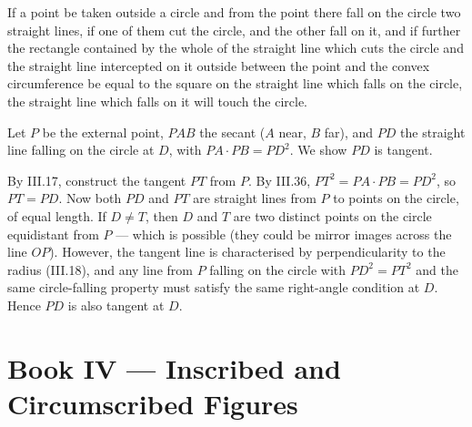 \documentclass{rrxiv}
\begin{document}
\begin{claim}
\label{prop:III.37}
If a point be taken outside a circle and from the point there fall
on the circle two straight lines, if one of them cut the circle, and
the other fall on it, and if further the rectangle contained by the
whole of the straight line which cuts the circle and the straight
line intercepted on it outside between the point and the convex
circumference be equal to the square on the straight line which
falls on the circle, the straight line which falls on it will touch
the circle.
\end{claim}
\begin{evidence}
\label{ev:III.37}
Let $P$ be the external point, $PAB$ the secant ($A$ near, $B$
far), and $PD$ the straight line falling on the circle at $D$,
with $PA \cdot PB = PD^2$.  We show $PD$ is tangent.

By III.17, construct the tangent $PT$ from $P$.  By III.36, $PT^2
= PA \cdot PB = PD^2$, so $PT = PD$.  Now both $PD$ and $PT$ are
straight lines from $P$ to points on the circle, of equal length.
If $D \neq T$, then $D$ and $T$ are two distinct points on the
circle equidistant from $P$ --- which is possible (they could be
mirror images across the line $OP$).  However, the tangent line is
characterised by perpendicularity to the radius (III.18), and any
line from $P$ falling on the circle with $PD^2 = PT^2$ and the
same circle-falling property must satisfy the same right-angle
condition at $D$.  Hence $PD$ is also tangent at $D$.
\end{evidence}
%
%

\section{Book IV --- Inscribed and Circumscribed Figures}
\label{sec:book-IV}
\end{document}

